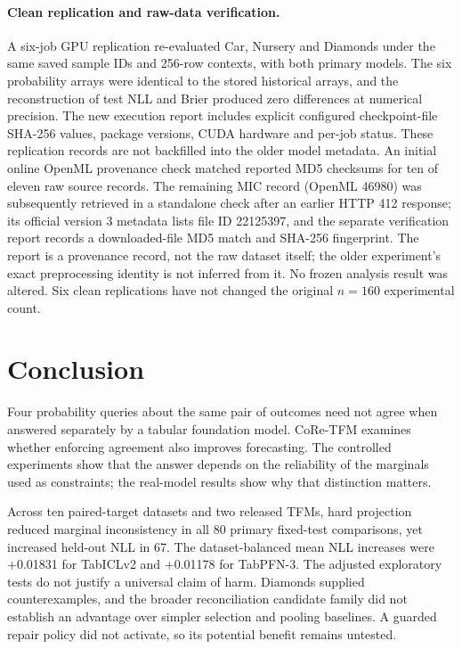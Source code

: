 \documentclass[a4paper,fleqn]{cas-sc}
\begin{document}
\paragraph{Clean replication and raw-data verification.}
A six-job GPU replication re-evaluated Car, Nursery and Diamonds under the same saved sample IDs and 256-row contexts, with both primary models. The six probability arrays were identical to the stored historical arrays, and the reconstruction of test NLL and Brier produced zero differences at numerical precision. The new execution report includes explicit configured checkpoint-file SHA-256 values, package versions, CUDA hardware and per-job status. These replication records are not backfilled into the older model metadata. An initial online OpenML provenance check matched reported MD5 checksums for ten of eleven raw source records. The remaining MIC record (OpenML 46980) was subsequently retrieved in a standalone check after an earlier HTTP 412 response; its official version 3 metadata lists file ID 22125397, and the separate verification report records a downloaded-file MD5 match and SHA-256 fingerprint. The report is a provenance record, not the raw dataset itself; the older experiment's exact preprocessing identity is not inferred from it. No frozen analysis result was altered. Six clean replications have not changed the original $n=160$ experimental count.

\section{Conclusion}
Four probability queries about the same pair of outcomes need not agree when answered separately by a tabular foundation model. CoRe-TFM examines whether enforcing agreement also improves forecasting. The controlled experiments show that the answer depends on the reliability of the marginals used as constraints; the real-model results show why that distinction matters.

Across ten paired-target datasets and two released TFMs, hard projection reduced marginal inconsistency in all 80 primary fixed-test comparisons, yet increased held-out NLL in 67. The dataset-balanced mean NLL increases were +0.01831 for TabICLv2 and +0.01178 for TabPFN-3. The adjusted exploratory tests do not justify a universal claim of harm. Diamonds supplied counterexamples, and the broader reconciliation candidate family did not establish an advantage over simpler selection and pooling baselines. A guarded repair policy did not activate, so its potential benefit remains untested.
\end{document}
